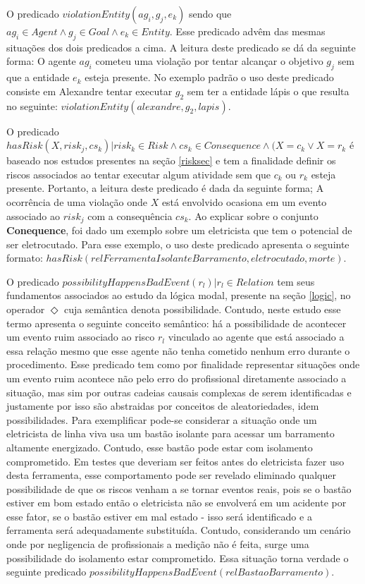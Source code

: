 O predicado $ violationEntity(ag_i,g_j,e_k) $ sendo que $ag_i \in Agent \wedge g_j \in Goal \wedge e_k \in Entity$. Esse predicado advêm das mesmas situações dos dois predicados a cima. A leitura deste predicado se dá da seguinte forma: O agente $ag_i$ cometeu uma violação por tentar alcançar o objetivo $g_j$ sem que a entidade $e_k$ esteja presente. No exemplo padrão o uso deste predicado consiste em Alexandre tentar executar $g_2$ sem ter a entidade lápis o que resulta no seguinte: $violationEntity(alexandre, g_2, lapis)$.

O predicado $ hasRisk(X, risk_j, cs_k) | risk_k \in Risk \wedge cs_k \in Consequence \wedge (X = c_k \vee X = r_k $ é baseado nos estudos presentes na seção \ref{risksec} e tem a finalidade definir os riscos associados ao tentar executar algum atividade sem que $c_k$ ou $r_k$ esteja presente. Portanto, a leitura deste predicado é dada da seguinte forma; A ocorrência de uma violação 
onde $X$ está envolvido ocasiona em um evento associado ao $risk_j$ com a consequência $cs_k$. Ao explicar sobre o conjunto \textbf{Conequence}, foi dado um exemplo sobre um eletricista que tem o potencial de ser eletrocutado. Para esse exemplo, o uso deste predicado apresenta o seguinte formato: $hasRisk(relFerramentaIsolanteBarramento, eletrocutado, morte)$.

O predicado $possibilityHappensBadEvent(r_l) | r_l \in Relation $ tem seus fundamentos associados ao estudo da lógica modal, presente na seção \ref{logic}, no operador $\Diamond$ cuja semântica denota possibilidade. Contudo, neste estudo esse termo apresenta o seguinte conceito semântico: há a possibilidade de acontecer um evento ruim associado ao risco $r_l$ vinculado ao agente que está associado a essa relação mesmo que esse agente não tenha cometido nenhum erro durante o procedimento. Esse predicado tem como por finalidade representar situações onde um evento ruim acontece não pelo erro do profissional diretamente associado a situação, mas sim por outras cadeias causais complexas de serem identificadas e justamente por isso são abstraidas por conceitos de aleatoriedades, idem possibilidades. Para exemplificar pode-se considerar a situação onde um eletricista de linha viva usa um bastão isolante para acessar um barramento altamente energizado. Contudo, esse bastão pode estar com isolamento comprometido. Em testes que deveriam ser feitos antes do eletricista fazer uso desta ferramenta, esse comportamento pode ser revelado eliminado qualquer possibilidade de que os riscos venham a se tornar eventos reais, pois se o bastão estiver em bom estado então o eletricista não se envolverá em um acidente por esse fator, se o bastão estiver em mal estado - isso será identificado e a ferramenta será adequadamente substituída. Contudo, considerando um cenário onde por negligencia de profissionais a medição não é feita, surge uma possibilidade do isolamento estar comprometido. Essa situação torna verdade o seguinte predicado $possibilityHappensBadEvent(relBastaoBarramento)$.

